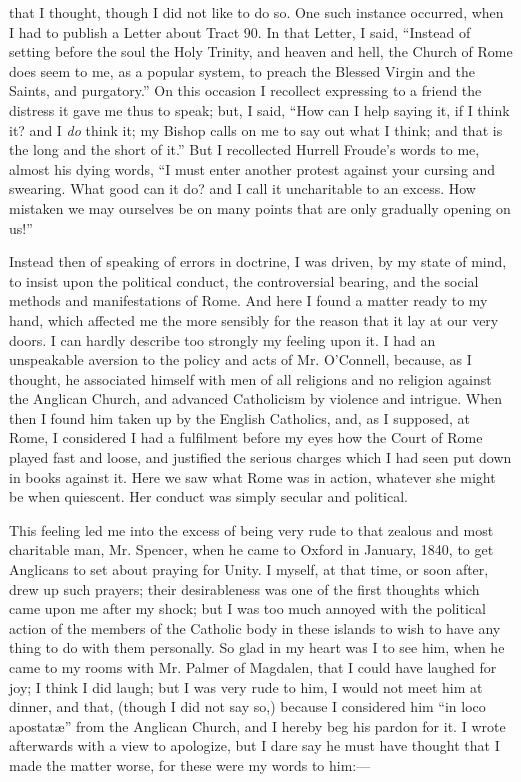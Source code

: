 that I thought, though I did not like to do so. One such instance
occurred, when I had to publish a Letter about Tract 90. In that Letter, I said, ``Instead of setting before the soul the Holy
Trinity, and heaven and hell, the Church of Rome does seem to me, as a
popular system, to preach the Blessed Virgin and the Saints, and
purgatory.'' On this occasion I recollect expressing to a friend the
distress it gave me thus to speak; but, I said, ``How can I help
saying it, if I think it? and I \emph{do} think it; my Bishop calls on
me to say out what I think; and that is the long and the short of
it.'' But I recollected Hurrell Froude's words to me, almost his
dying words, ``I must enter another protest against your cursing and
swearing. What good can it do? and I call it uncharitable to an excess.
How mistaken we may ourselves be on many points that are only gradually
opening on us!''

Instead then of speaking of errors in doctrine, I
was driven, by my state of mind, to insist upon the political conduct,
the controversial bearing, and the social methods and manifestations of
Rome. And here I found a matter ready to my hand, which affected
me the more sensibly for the reason that it lay at our very doors. I can hardly describe too strongly
my feeling upon it. I had an unspeakable aversion to the policy and acts
of Mr. O'Connell, because, as I thought, he associated himself with men
of all religions and no religion against the Anglican Church, and
advanced Catholicism by violence and intrigue. When then I found him
taken up by the English Catholics, and, as I supposed, at Rome, I
considered I had a fulfilment before my eyes how the Court of Rome
played fast and loose, and justified the serious charges which I
had seen put down in books against it. Here we saw what Rome was in
action, whatever she might be when quiescent. Her conduct was simply
secular and political.

This feeling led me into the excess of being very rude to that
zealous and most charitable man, Mr. Spencer, when he came to Oxford in
January, 1840, to get Anglicans to set about praying for Unity. I myself,
at that time, or soon after, drew up such prayers; their desirableness was
one of the first thoughts which came upon me after my shock; but I was
too much annoyed with the political action of the members of the
Catholic body in these islands to wish to have any thing to do with them
personally. So glad in my heart was I to see him, when he came to my
rooms with Mr. Palmer of Magdalen, that I
could have laughed for joy; I think I did laugh; but I was very
rude to him, I would not meet him at dinner, and that, (though I did not
say so,) because I considered him ``in loco apostatæ'' from the
Anglican Church, and I hereby beg his pardon for it. I wrote afterwards
with a view to apologize, but I dare say he must have thought that I
made the matter worse, for these were my words to him:—

